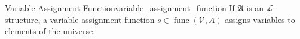 \begin{definition}{Variable Assignment Function}{variable_assignment_function}
If $\mathfrak{A}$ is an $\mathcal{L}$-structure, a variable assignment function $ s \in  \operatorname{ func } \left( \mathcal{ V } , A  \right)  $ assigns variables to elements of the universe. 
\end{definition}
